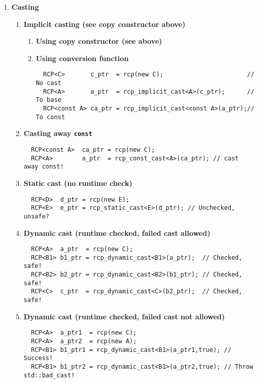 \documentclass[pdf,ps2pdf,11pt]{SANDreport}
\begin{document}
\begin{enumerate}
\item {\bf Casting}
\label{rcpqs:apdx:qs:casting}
%
\begin{enumerate}
%
\item {\bf Implicit casting (see copy constructor above)}
%
\begin{enumerate}
%
\item {\bf Using copy constructor (see above)}
%
\item {\bf Using conversion function}
%
{\small\begin{verbatim}
  RCP<C>       c_ptr  = rcp(new C);                       // No cast
  RCP<A>       a_ptr  = rcp_implicit_cast<A>(c_ptr);      // To base
  RCP<const A> ca_ptr = rcp_implicit_cast<const A>(a_ptr);// To const
\end{verbatim}}
%
\end{enumerate}
%
\item {\bf Casting away \texttt{const}}
%
{\small\begin{verbatim}
  RCP<const A>  ca_ptr = rcp(new C);
  RCP<A>        a_ptr  = rcp_const_cast<A>(ca_ptr); // cast away const!
\end{verbatim}}
%
\item {\bf Static cast (no runtime check)}
%
{\small\begin{verbatim}
  RCP<D>  d_ptr = rcp(new E);
  RCP<E>  e_ptr = rcp_static_cast<E>(d_ptr); // Unchecked, unsafe?
\end{verbatim}}
%
\item {\bf Dynamic cast (runtime checked, failed cast allowed)}
%
{\small\begin{verbatim}
  RCP<A>  a_ptr  = rcp(new C);
  RCP<B1> b1_ptr = rcp_dynamic_cast<B1>(a_ptr);  // Checked, safe!
  RCP<B2> b2_ptr = rcp_dynamic_cast<B2>(b1_ptr); // Checked, safe!
  RCP<C>  c_ptr  = rcp_dynamic_cast<C>(b2_ptr);  // Checked, safe!
\end{verbatim}}
%
\item {\bf Dynamic cast (runtime checked, failed cast not allowed)}
%
{\small\begin{verbatim}
  RCP<A>  a_ptr1  = rcp(new C);
  RCP<A>  a_ptr2  = rcp(new A);
  RCP<B1> b1_ptr1 = rcp_dynamic_cast<B1>(a_ptr1,true); // Success!
  RCP<B1> b1_ptr2 = rcp_dynamic_cast<B1>(a_ptr2,true); // Throw std::bad_cast!
\end{verbatim}}
%
\end{enumerate}

\pagebreak


\end{enumerate}
\end{document}
